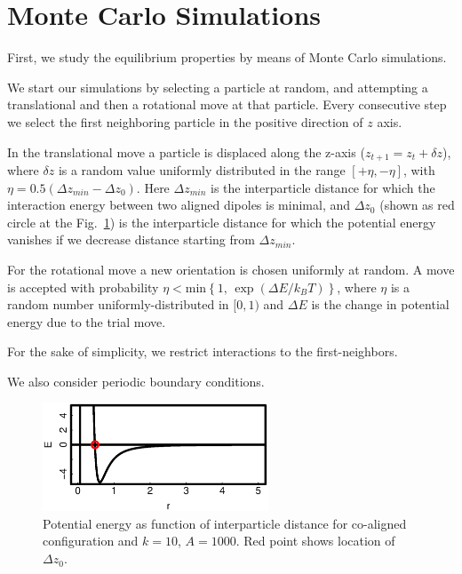 \section{Monte Carlo Simulations}

First, we study the equilibrium properties by means of Monte Carlo simulations.

We start our simulations by selecting a particle at random, and attempting a translational and then a rotational move at that particle. Every consecutive step we select the first neighboring particle in the positive direction of $z$ axis.

In the translational move a particle is displaced along the z-axis ($z_{t+1} = z_t + \delta z$), where $\delta z$ is a random value uniformly distributed in the range $[+\eta, -\eta]$, with $\eta = 0.5 (\Delta z_{min} - \Delta z_0)$. Here $\Delta z_{min}$ is the interparticle distance for which the interaction energy between two aligned dipoles is minimal, and $\Delta z_0$ (shown as red circle at the Fig.~\ref{fig:delta_z_0_location}) is the interparticle distance for which the potential energy vanishes if we decrease distance starting from $\Delta z_{min}$.

For the rotational move a new orientation is chosen uniformly at random. A move is accepted with probability $\eta < \mathrm{min} \left\{1, \, \exp(\Delta E / k_BT) \right\}$, where $\eta$ is a random number uniformly-distributed in $[0, 1)$ and $\Delta E$ is the change in potential energy due to the trial move.

For the sake of simplicity, we restrict interactions to the first-neighbors.

We also consider periodic boundary conditions.

\begin{figure}
	\centering
	\includegraphics[width=0.6\textwidth]{Images/potential_energy_zero}
	\captionsetup{justification=centering, width=0.9\textwidth}
	\caption{Potential energy as function of interparticle distance for co-aligned configuration and $k = 10$, $A = 1000$. Red point shows location of $\Delta z_0$.}
	\label{fig:delta_z_0_location}
\end{figure}